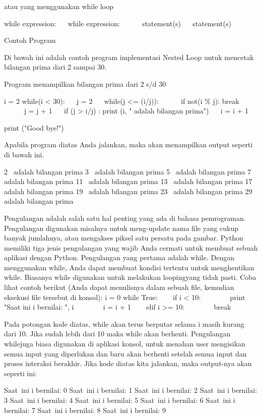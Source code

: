 atau yang menggunakan while loop

 
while expression: 
~~ while expression: 
~~~~~ statement(s) 
~~ statement(s) 

Contoh Program

Di bawah ini adalah contoh program implementasi Nested Loop untuk mencetak bilangan prima dari 2 sampai 30.

 
Program menampilkan bilangan prima dari 2 s/d 30 

i = 2 
while(i < 30): 
~~ j = 2 
~~ while(j <= (i/j)): 
~~~~~ if not(i   \%  j): break 
~~~~~ j = j + 1 
~~ if (j > i/j) : print (i, " adalah bilangan prima") 
~~ i = i + 1 

print ("Good bye!") 


Apabila program diatas Anda jalankan, maka akan menampilkan output seperti di bawah ini.

 
2~ adalah bilangan prima 
3~ adalah bilangan prima 
5~ adalah bilangan prima 
7~ adalah bilangan prima 
11~ adalah bilangan prima 
13~ adalah bilangan prima 
17~ adalah bilangan prima 
19~ adalah bilangan prima 
23~ adalah bilangan prima 
29~ adalah bilangan prima 

Pengulangan adalah salah satu hal penting yang ada di bahasa pemrograman. Pengulangan digunakan misalnya untuk meng-update   nama   file   yang cukup banyak jumlahnya, atau mengakses piksel satu persatu pada gambar. 
Python memiliki tiga jenis pengulangan yang wajib Anda cermati untuk membuat sebuah aplikasi dengan Python. Pengulangan yang pertama adalah   while. Dengan menggunakan   while, Anda dapat membuat kondisi tertentu untuk menghentikan   while. Biasanya   while   digunakan untuk melakukan   loopingyang tidak pasti. Coba lihat contoh berikut (Anda dapat menulisnya dalam sebuah   file, kemudian eksekusi   file   tersebut di konsol): 
i = 0 
while True: 
~~~ if i < 10: 
~~~~~~~ print "Saat ini i bernilai: ", i 
~~~~~~~ i = i + 1 
~~~ elif i >= 10: 
~~~~~~~ break 

Pada potongan kode diatas,   while   akan terus berputar selama i masih kurang dari 10. Jika sudah lebih dari 10 maka   while   akan berhenti. Pengulangan   whilejuga biasa digunakan di aplikasi konsol, untuk menahan   user   mengisikan semua input yang diperlukan dan baru akan berhenti setelah semua input dan proses interaksi berakhir. Jika kode diatas kita jalankan, maka   output-nya akan seperti ini: 

Saat~ini i bernilai:  0 
Saat~ini i bernilai:  1 
Saat~ini i bernilai:  2 
Saat~ini i bernilai:  3 
Saat~ini i bernilai:  4 
Saat~ini i bernilai:  5 
Saat~ini i bernilai:  6 
Saat~ini i bernilai:  7 
Saat~ini i bernilai:  8 
Saat~ini i bernilai:  9 

